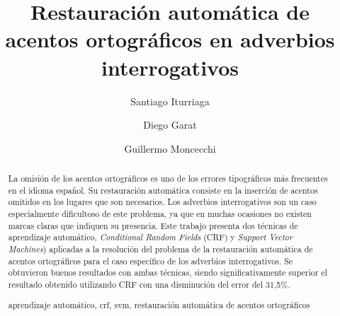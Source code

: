 \documentclass[runningheads,a4paper]{llncs}
\newcommand{\keywords}[1]{\par\addvspace\baselineskip
\noindent\keywordname\enspace\ignorespaces#1}
\begin{document}
\mainmatter  %

\title{Restauración automática de acentos ortográficos en adverbios interrogativos}


%
%
\author{Santiago Iturriaga \and Diego Garat \and Guillermo Moncecchi} 

%


%
%

\maketitle

\begin{abstract}
La omisión de los acentos ortográficos es uno de los errores tipográficos más frecuentes en el idioma español. Su restauración automática consiste en la inserción de acentos   omitidos en los lugares que son necesarios. Los adverbios interrogativos son un caso especialmente dificultoso de este problema, ya que en muchas ocasiones no existen marcas claras que indiquen su presencia. Este trabajo presenta dos técnicas de aprendizaje automático, \emph{Conditional Random Fields} (CRF) y \emph{Support Vector Machines}) aplicadas a la resolución del problema de la restauración automática de acentos ortográficos para el caso específico de los adverbios interrogativos. Se obtuvieron buenos resultados con ambas t\'ecnicas, siendo significativamente superior el resultado obtenido utilizando CRF con una disminuci\'on del error del 31,5\%.
\keywords{aprendizaje automático, crf, svm, restauración automática de acentos ortográficos}
\end{abstract}
\end{document}
